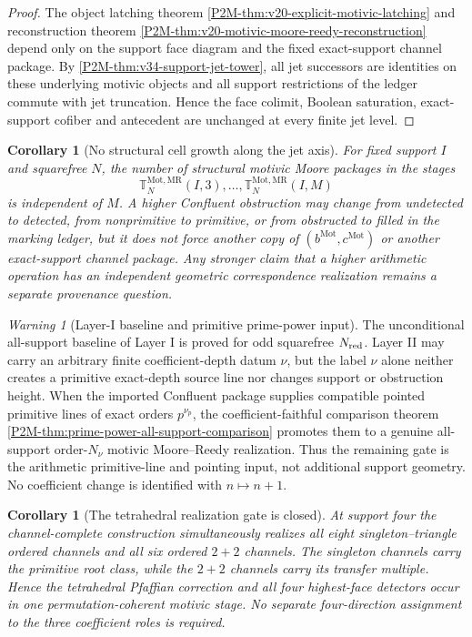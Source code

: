 \documentclass[11pt]{article}
\newtheorem{corollary}[theorem]{Corollary}
\theoremstyle{remark}
\newtheorem{warning}[theorem]{Warning}
\newcommand{\Mot}{\mathrm{Mot}}
\newcommand{\MR}{\mathrm{MR}}
\begin{document}
\begin{proof}
The object latching theorem
\cref{P2M-thm:v20-explicit-motivic-latching} and reconstruction theorem
\cref{P2M-thm:v20-motivic-moore-reedy-reconstruction} depend only on the support
face diagram and the fixed exact-support channel package.  By
\cref{P2M-thm:v34-support-jet-tower}, all jet successors are identities on these
underlying motivic objects and all support restrictions of the ledger commute
with jet truncation.  Hence the face colimit, Boolean saturation, exact-support
cofiber and antecedent are unchanged at every finite jet level.
\end{proof}

\begin{corollary}[No structural cell growth along the jet axis]
\label{P2M-cor:v34-no-jet-structural-growth}
For fixed support $I$ and squarefree $N$, the number of structural motivic
Moore packages in the stages
\[
 \mathbb T_N^{\Mot,\MR}(I,3),\ldots,
 \mathbb T_N^{\Mot,\MR}(I,M)
\]
is independent of $M$.  A higher Confluent obstruction may change from
undetected to detected, from nonprimitive to primitive, or from obstructed to
filled in the marking ledger, but it does not force another copy of
$(b^{\Mot},c^{\Mot})$ or another exact-support channel package.  Any stronger
claim that a higher arithmetic operation has an independent geometric
correspondence realization remains a separate provenance question.
\end{corollary}

\begin{warning}[Layer-I baseline and primitive prime-power input]
\label{P2M-warn:v33-squarefree-jet-scope}
The unconditional all-support baseline of Layer I is proved for odd squarefree
$N_{\rm red}$.  Layer II may carry an arbitrary finite coefficient-depth datum
$\nu$, but the label $\nu$ alone neither creates a primitive exact-depth source
line nor changes support or obstruction height.  When the imported Confluent
package supplies compatible pointed primitive lines of exact orders
$p^{\nu_p}$, the coefficient-faithful comparison theorem
\cref{P2M-thm:prime-power-all-support-comparison} promotes them to a genuine
all-support order-$N_\nu$ motivic Moore--Reedy realization.  Thus the remaining
gate is the arithmetic primitive-line and pointing input, not additional
support geometry.  No coefficient change is identified with $n\mapsto n+1$.
\end{warning}

\begin{corollary}[The tetrahedral realization gate is closed]
\label{P2M-cor:remaining-geometric-gate}
At support four the channel-complete construction simultaneously realizes all
eight singleton--triangle ordered channels and all six ordered $2+2$
channels.  The singleton channels carry the primitive root class, while the
$2+2$ channels carry its transfer multiple.  Hence the tetrahedral Pfaffian
correction and all four highest-face detectors occur in one
permutation-coherent motivic stage.  No separate four-direction assignment to
the three coefficient roles is required.
\end{corollary}
\end{document}
